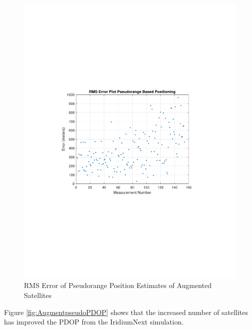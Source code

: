 \documentclass[12pt]{report}
\begin{document}
\begin{figure}[h!]
    \centering
    \includegraphics[trim=1.2in 3.3in 1.75in 3.3in,clip,width=5in]
    {Augment_5min_pseudo_RMSE.pdf}
    \caption{RMS Error of Pseudorange Position Estimates of Augmented Satellites}
    \label{fig:AugmentpseudoRMSE}
\end{figure}
Figure \ref{fig:AugmentpseudoPDOP} shows that the increased number of satellites has improved the PDOP from the IridiumNext simulation. 
\end{document}
